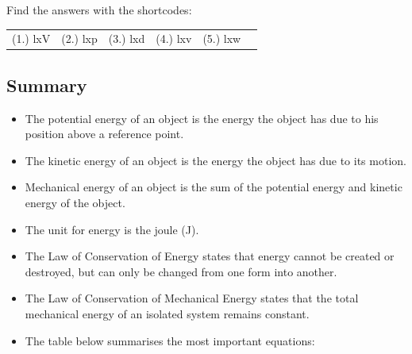     \label{m38786*cid8}
\par {} Find the answers with the shortcodes:
 \par \begin{tabular}[h]{cccccc}
 (1.) lxV  &  (2.) lxp  &  (3.) lxd  &  (4.) lxv  &  (5.) lxw  & \end{tabular}
            \subsection{ Summary}
            \nopagebreak
      \label{m38786*id70947}\begin{itemize}[noitemsep]
            \label{m38786*uid111}\item The potential energy of an object is the energy the object has due to his position above a reference point.
\label{m38786*uid112}\item The kinetic energy of an object is the energy the object has due to its motion.
\label{m38786*uid113}\item Mechanical energy of an object is the sum of the potential energy and kinetic energy of the object.
\label{m38786*uid114}\item The unit for energy is the joule (J).
\label{m38786*uid115}\item The Law of Conservation of Energy states that energy cannot be created or destroyed, but can only be changed from one form into another.
\label{m38786*uid116}\item The Law of Conservation of Mechanical Energy states that the total mechanical energy of an isolated system remains constant.
\label{m38786*uid117}\item The table below summarises the most important equations:
\end{itemize}
